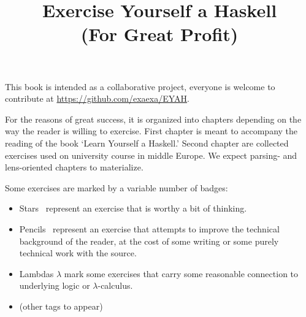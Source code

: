 \documentclass[10pt,a5paper]{book}
\title{Exercise Yourself a Haskell \\ \vspace{1em} \Large (For Great Profit)}
\date{}
\begin{document}
\sloppy

\maketitle

This book is intended as a collaborative project, everyone is welcome to
contribute at \url{https://github.com/exaexa/EYAH}.

For the reasons of great success, it is organized into chapters depending on
the way the reader is willing to exercise. First chapter is meant to accompany
the reading of the book `Learn Yourself a Haskell.' Second chapter are
collected exercises used on university course in middle Europe. We expect
parsing- and lens-oriented chapters to materialize.

Some exercises are marked by a variable number of badges:
\begin{itemize}
\item Stars \FiveStar\ represent an exercise that is worthy a bit of thinking.
\item Pencils \PencilLeftDown\ represent an exercise that attempts to improve
the technical background of the reader, at the cost of some writing or some
purely technical work with the source.
\item Lambdas {\large $\lambda$} mark some exercises that carry some reasonable
connection to underlying logic or $\lambda$-calculus.
\item (other tags to appear)
\end{itemize}
\end{document}
